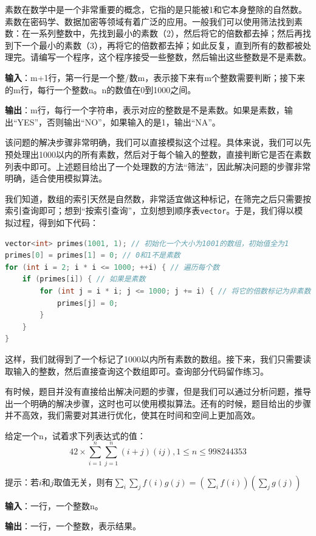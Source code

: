 \documentclass{article}
\begin{document}
\begin{example}
  素数在数学中是一个非常重要的概念，它指的是只能被1和它本身整除的自然数。素数在密码学、数据加密等领域有着广泛的应用。一般我们可以使用筛法找到素数：在一系列整数中，先找到最小的素数（2），然后将它的倍数都去掉；然后再找到下一个最小的素数（3），再将它的倍数都去掉；如此反复，直到所有的数都被处理完。请编写一个程序，这个程序接受一些整数，然后输出这些整数是不是素数。

  \textbf{输入}：m+1行，第一行是一个整/数m，表示接下来有m个整数需要判断；接下来的m行，每行一个整数n。n的数值在0到1000之间。

  \textbf{输出}：m行，每行一个字符串，表示对应的整数是不是素数。如果是素数，输出“YES”，否则输出“NO”，如果输入的是1，输出“NA”。
\end{example}

\begin{soln}
  该问题的解决步骤非常明确，我们可以直接模拟这个过程。具体来说，我们可以先预处理出1000以内的所有素数，然后对于每个输入的整数，直接判断它是否在素数列表中即可。上述题目给出了一个处理数的方法“筛法”，因此解决问题的步骤非常明确，适合使用模拟算法。

  我们知道，数组的索引天然是自然数，非常适宜做这种标记，在筛完之后只需要按索引查询即可；想到“按索引查询”，立刻想到顺序表\texttt{vector}。于是，我们得以模拟过程，得到如下代码：
\begin{lstlisting}[language=C++]
vector<int> primes(1001, 1); // 初始化一个大小为1001的数组，初始值全为1
primes[0] = primes[1] = 0; // 0和1不是素数
for (int i = 2; i * i <= 1000; ++i) { // 遍历每个数
    if (primes[i]) { // 如果是素数
        for (int j = i * i; j <= 1000; j += i) { // 将它的倍数标记为非素数
            primes[j] = 0;
        }
    }
}
\end{lstlisting}
  这样，我们就得到了一个标记了1000以内所有素数的数组。接下来，我们只需要读取输入的整数，然后直接查询这个数组即可。查询部分代码留作练习。
\end{soln}

有时候，题目并没有直接给出解决问题的步骤，但是我们可以通过分析问题，推导出一个明确的解决步骤，这时也可以使用模拟算法。还有的时候，题目给出的步骤并不高效，我们需要对其进行优化，使其在时间和空间上更加高效。

\begin{example}
  给定一个n，试着求下列表达式的值：
  $$42 \times \sum_{i=1}^{n} \sum_{j=1}^{n}(i+j)(ij) , 1\leqslant n \leqslant 998244353 $$

  提示：若$i$和$j$取值无关，则有$\sum_i \sum_j f(i)g(j) =( \sum_i f(i)) (\sum_j g(j))$

  \textbf{输入}：一行，一个整数n。

  \textbf{输出}：一行，一个整数，表示结果。
\end{example}
\end{document}
